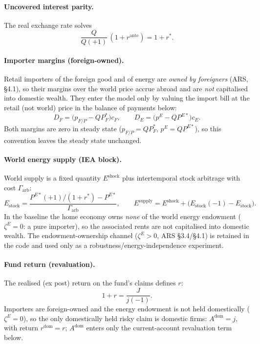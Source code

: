 \documentclass[11pt,a4paper]{article}
\newcommand{\pE}{p^{E}}
\begin{document}
\paragraph{Uncovered interest parity.} The real exchange rate solves
\begin{equation}
\frac{Q}{Q(+1)}\,(1+r^{\text{ante}})=1+r^{*}. \label{eq:uip}
\end{equation}

\paragraph{Importer margins (foreign-owned).} Retail importers of the foreign
good and of energy are \emph{owned by foreigners} (ARS, \S4.1), so their margins
over the world price accrue abroad and are \emph{not} capitalised into domestic
wealth. They enter the model only by valuing the import bill at the retail (not
world) price in the balance of payments below:
\begin{equation}
D_F = \bigl(p_{F/P}-Q P^{*}_{F}\bigr)c_F,\qquad
D_E = \bigl(\pE-Q P^{E*}\bigr)c_E .
\end{equation}
Both margins are zero in steady state ($p_{F/P}=Q P^{*}_{F}$, $\pE=Q P^{E*}$), so
this convention leaves the steady state unchanged.

\paragraph{World energy supply (IEA block).} World supply is a fixed quantity
$E^{\text{shock}}$ plus intertemporal stock arbitrage with cost $\Gamma_{\text{arb}}$:
\begin{equation}
E_{\text{stock}} = \frac{P^{E*}(+1)/(1+r^{*})-P^{E*}}{\Gamma_{\text{arb}}},\qquad
E^{\text{supply}} = E^{\text{shock}}+\bigl(E_{\text{stock}}(-1)-E_{\text{stock}}\bigr).
\end{equation}
In the baseline the home economy owns \emph{none} of the world energy endowment
($\zeta^{E}=0$: a pure importer), so the associated rents are not capitalised
into domestic wealth. The endowment-ownership channel ($\zeta^{E}>0$, ARS
\S3.4/\S4.1) is retained in the code and used only as a robustness/energy-independence
experiment.

\paragraph{Fund return (revaluation).} The realised (ex post) return on the
fund's claims defines $r$:
\begin{equation}
1+r=\frac{J}{j(-1)}.
\end{equation}
Importers are foreign-owned and the energy endowment is not held domestically
($\zeta^{E}=0$), so the only domestically held risky claim is domestic firms:
$A^{\text{dom}}=j$, with return $r^{\text{dom}}=r$; $A^{\text{dom}}$ enters only
the current-account revaluation term below.
\end{document}
